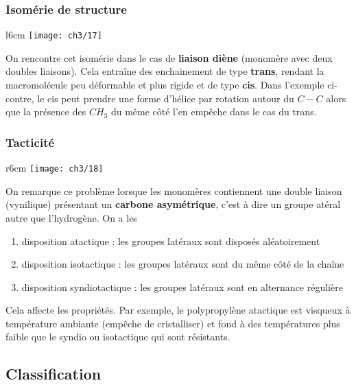 		\subsubsection{Isomérie de structure}
		\begin{wrapfigure}[7]{l}{6cm}
		\vspace{-5mm}
		\texttt{[image: ch3/17]}
		\end{wrapfigure}	
		On rencontre cet isomérie dans le cas de \textbf{liaison diène} (monomère avec deux doubles liaisons). Cela entraîne des enchainement de type \textbf{trans}, rendant la macromolécule peu déformable et plus rigide et de type \textbf{cis}. Dans l'exemple ci-contre, le cis peut prendre une forme d'hélice par rotation autour du $C-C$ alors que la présence des $CH_3$ du même côté l'en empêche dans le cas du trans. 
		
		\subsubsection{Tacticité}
		\begin{wrapfigure}[7]{r}{6cm}
			\vspace{-5mm}
			\texttt{[image: ch3/18]}
			\end{wrapfigure}	
			On remarque ce problème lorsque les monomères contiennent une double liaison (vynilique) présentant un \textbf{carbone asymétrique}, c'est à dire un groupe atéral autre que l'hydrogène.  On a les
			\begin{enumerate}
				\item disposition atactique : les groupes latéraux sont disposés aléatoirement
				\item disposition isotactique : les groupes latéraux sont du même côté de la chaîne
				\item disposition syndiotactique : les groupes latéraux sont en alternance régulière
			\end{enumerate}
			Cela affecte les propriétés. Par exemple, le polypropylène atactique est visqueux à température ambiante (empêche de cristalliser) et fond à des températures plus faible que le syndio ou isotactique qui sont résistants. 
		
	\subsection{Classification}
